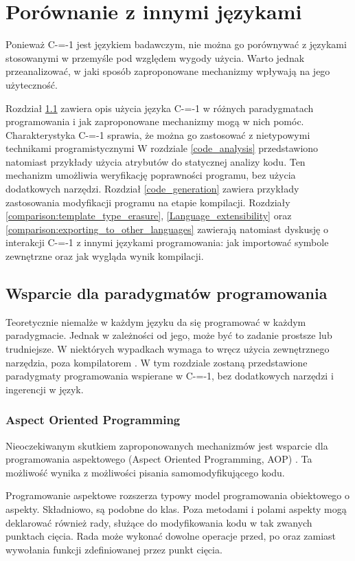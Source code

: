 \section{Porównanie z innymi językami}
\label{comparison}

Ponieważ C-=-1 jest językiem badawczym, nie można go porównywać z językami stosowanymi w przemyśle pod względem wygody użycia.
Warto jednak przeanalizować, w jaki sposób zaproponowane mechanizmy wpływają na jego użyteczność.

Rozdział \ref{programming_paradigms} zawiera opis użycia języka C-=-1 w różnych paradygmatach programowania i jak zaproponowane mechanizmy mogą w nich pomóc.
Charakterystyka C-=-1 sprawia, że można go zastosować z nietypowymi technikami programistycznymi
W rozdziale \ref{code_analysis} przedstawiono natomiast przykłady użycia atrybutów do statycznej analizy kodu.
Ten mechanizm umożliwia weryfikację poprawności programu, bez użycia dodatkowych narzędzi.
Rozdział \ref{code_generation} zawiera przykłady zastosowania modyfikacji programu na etapie kompilacji.
Rozdziały \ref{comparison:template_type_erasure}, \ref{Language_extensibility} oraz \ref{comparison:exporting_to_other_languages} zawierają natomiast dyskusję o interakcji C-=-1 z innymi językami programowania: jak importować symbole zewnętrzne oraz jak wygląda wynik kompilacji.

\subsection{Wsparcie dla paradygmatów programowania}
\label{programming_paradigms}
Teoretycznie niemalże w każdym języku da się programować w każdym paradygmacie. Jednak w zależności od jego, może być to zadanie prostsze lub trudniejsze.
W niektórych wypadkach wymaga to wręcz użycia zewnętrznego narzędzia, poza kompilatorem \cite{aop:cpp}.
W tym rozdziale zostaną przedstawione paradygmaty programowania wspierane w C-=-1, bez dodatkowych narzędzi i ingerencji w język.

\subsubsection{Aspect Oriented Programming}
Nieoczekiwanym skutkiem zaproponowanych mechanizmów jest wsparcie dla programowania aspektowego (Aspect Oriented Programming, AOP) \cite{aop}.
Ta możliwość wynika z możliwości pisania samomodyfikującego kodu.

Programowanie aspektowe rozszerza typowy model programowania obiektowego o aspekty.
Składniowo, są podobne do klas.
Poza metodami i polami aspekty mogą deklarować również rady, służące do modyfikowania kodu w tak zwanych punktach cięcia.
Rada może wykonać dowolne operacje przed, po oraz zamiast wywołania funkcji zdefiniowanej przez punkt cięcia.

